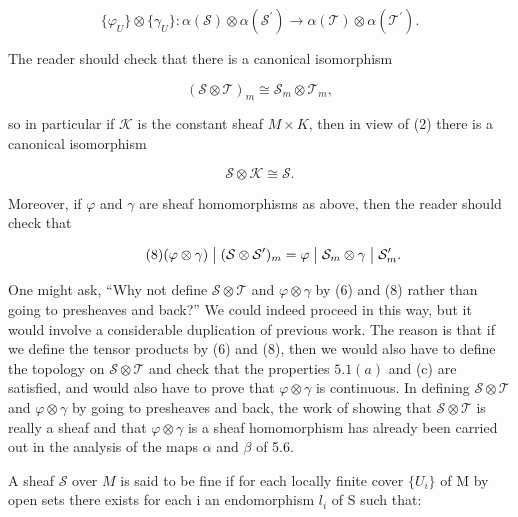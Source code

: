 \begin{equation}
\tag{5}\label{eq:5.9:5}
\{\varphi_{U}\}\otimes\{\gamma_{U}\}\colon\alpha(\mathcal{S})\otimes\alpha(\mathcal{S}^{\prime})\to\alpha(\mathcal{T})\otimes\alpha(\mathcal{T}^{\prime}).
\end{equation}

The reader should check that there is a canonical isomorphism

\begin{equation}
\tag{6}\label{eq:5.9:6}
(\mathcal{S}\otimes\mathcal{T})_{m}\cong\mathcal{S}_{m}\otimes\mathcal{T}_{m},
\end{equation}

so in particular if $\mathcal{K}$ is the constant sheaf $M\times K$, then in view of (2) there is a canonical isomorphism

\begin{equation}
\tag{7}\label{eq:5.9:7}
\mathcal{S}\otimes\mathcal{K}\cong\mathcal{S}.
\end{equation}

Moreover, if $\varphi$ and $\gamma$ are sheaf homomorphisms as above, then the reader should check that

\begin{equation}
\tag{8}\label{eq:5.9:8}
(\varphi\otimes\gamma)\bigm|(\mathcal{S}\otimes\mathcal{S}^{\prime})_{m}=\varphi\bigm|\mathcal{S}_{m}\otimes\gamma\bigm|\mathcal{S}_{m}^{\prime}.
\end{equation}

One might ask, “Why not define $\mathcal{S}\otimes\mathcal{T}$ and $\varphi\otimes\gamma$ by (6) and (8) rather than going to presheaves and back?” We could indeed proceed in this way, but it would involve a considerable duplication of previous work. The reason is that if we define the tensor products by (6) and (8), then we would also have to define the topology on $\mathcal{S}\otimes\mathcal{T}$ and check that the properties $5.1(a)$ and (c) are satisfied, and would also have to prove that $\varphi\otimes\gamma$ is continuous. In defining $\mathcal{S}\otimes\mathcal{T}$ and $\varphi\otimes\gamma$ by going to presheaves and back, the work of showing that $\mathcal{S}\otimes\mathcal{T}$ is really a sheaf and that $\varphi\otimes\gamma$ is a sheaf homomorphism has already been carried out in the analysis of the maps $\alpha$ and $\beta$ of 5.6.

\label{thm:5.10} A sheaf $\mathcal{S}$ over $M$ is said to be fine if for each locally finite cover  $ \{U_{i}\} $ of M by open sets there exists for each i an endomorphism  $ l_{i} $ of S such that:

